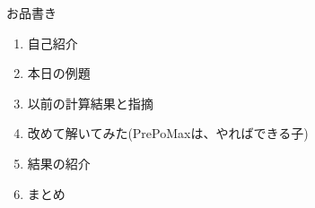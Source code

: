 \begin{frame}{お品書き}
  \begin{enumerate}[label=\textbf{ \arabic*.},itemsep=1.3ex, leftmargin=1cm]
    \item 自己紹介
    \item 本日の例題
    \item 以前の計算結果と指摘
    \item 改めて解いてみた(PrePoMaxは、やればできる子)
    \item 結果の紹介
    \item まとめ
  \end{enumerate}
\end{frame}

